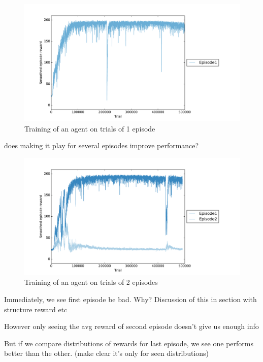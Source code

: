 \begin{figure}
	\centering
	\includegraphics[width=0.9\linewidth]{fig/20perms1ep_training.pdf}
	\caption{Training of an agent on trials of 1 episode}
	\label{fig:20perms1ep_training}
\end{figure}

does making it play for several episodes improve performance?

\begin{figure}
	\centering
	\includegraphics[width=0.9\linewidth]{fig/20perms2ep_training.pdf}
	\caption{Training of an agent on trials of 2 episodes}
	\label{fig:20perms2ep_training}
\end{figure}

Immediately, we see first episode be bad. Why? Discussion of this in section
with structure reward etc

However only seeing the avg reward of second episode doesn't give us enough
info

But if we compare distributions of rewards for last episode, we see one 
performs better than the other. (make clear it's only for seen distributions)

